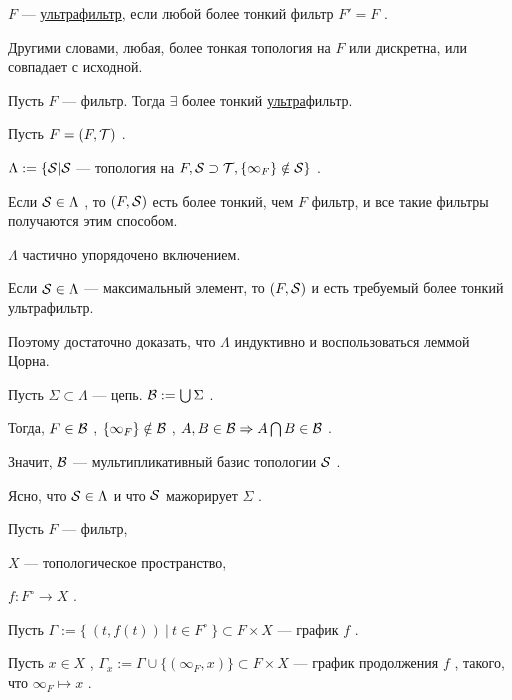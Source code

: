 \SSsect[def] \( F \) --- \underline{ультрафильтр}, если любой более тонкий фильтр \( F' = F \) .

Другими словами, любая, более тонкая топология на \( F\) или дискретна, или совпадает с исходной.

\SSsect[!] Пусть \( F \) --- фильтр. Тогда \( \exists \) более тонкий \underline{ультра}фильтр.

\SSproof

Пусть \( F = (F,\mathcal{T}) \) .

\( \Lambda := \{ \mathcal{S} | \mathcal{S} \) --- топология на \( F, \mathcal{S} \supset \mathcal{T} , \{\infty_F\} \notin \mathcal{S} \} \) .

Если \( \mathcal{S} \in \Lambda \) , то \( (F,\mathcal{S}) \) есть более тонкий, чем \( F \) фильтр, и все такие фильтры получаются этим способом.

\( \Lambda \) частично упорядочено включением.

Если \( \mathcal{S} \in \Lambda \) --- максимальный элемент, то \( (F,\mathcal{S}) \) и есть требуемый более тонкий ультрафильтр.

Поэтому достаточно доказать, что \( \Lambda \) индуктивно и воспользоваться леммой Цорна.

Пусть \( \Sigma \subset \Lambda \) --- цепь. \( \mathcal{B} := \bigcup \Sigma \) .

Тогда, \( F \in \mathcal{B} \) , \( \{\infty_F\} \notin \mathcal{B} \) , \( A,B \in \mathcal{B}  \Rightarrow A \bigcap B \in \mathcal{B} \) .

Значит, \( \mathcal{B} \) --- мультипликативный базис топологии \( \mathcal{S} \) .

Ясно, что \( \mathcal{S} \in \Lambda \) и что \( \mathcal{S} \) мажорирует \( \Sigma \) .

\SSendp

\pagebreak

\SSbullet 

\vspace

\begin{center}
Пусть \( F \) --- фильтр,

\( X \) --- топологическое пространство,

\( f: F^\circ \rightarrow X \) .
\end{center}

\SSsect Пусть \( \Gamma := \{~ (t,f(t)) ~|~ t \in F^\circ ~\} \subset F \times X \) --- график \( f \) .

Пусть \( x \in X \) , \( \Gamma_x := \Gamma \cup \{ (\infty_F,x) \} \subset F \times X \) --- график продолжения \( f \) , такого, что \( \infty_F \mapsto x \) .
\vspace
{}

